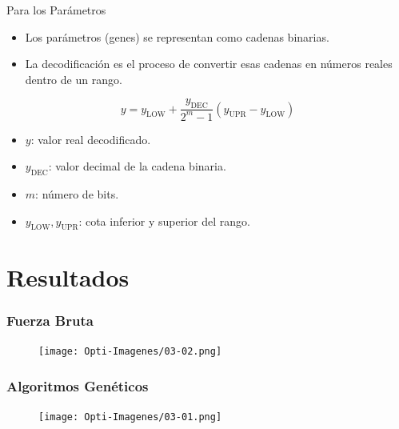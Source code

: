 \documentclass[aspectratio=1610]{beamer}
\begin{document}
\begin{frame}{Para los Parámetros}
\begin{itemize}
    \item Los parámetros (genes) se representan como cadenas binarias.
    \item La decodificación es el proceso de convertir esas cadenas en números reales dentro de un rango.
\end{itemize}


\[
y = y_{\text{LOW}} + \frac{y_{\text{DEC}}}{2^m - 1}(y_{\text{UPR}} - y_{\text{LOW}})
\]

\begin{itemize}
    \item \( y \): valor real decodificado.
    \item \( y_{\text{DEC}} \): valor decimal de la cadena binaria.
    \item \( m \): número de bits.
    \item \( y_{\text{LOW}}, y_{\text{UPR}} \): cota inferior y superior del rango.
\end{itemize}
\end{frame}




























\section{Resultados}


\begin{frame}[fragile]
    \frametitle{Fuerza Bruta}
    \begin{figure}
        \centering
        \texttt{[image: Opti-Imagenes/03-02.png]}
    \end{figure}
\end{frame}


\begin{frame}[fragile]
    \frametitle{Algoritmos Genéticos}
    \begin{figure}
        \centering
        \texttt{[image: Opti-Imagenes/03-01.png]}
    \end{figure}
\end{frame}
\end{document}
